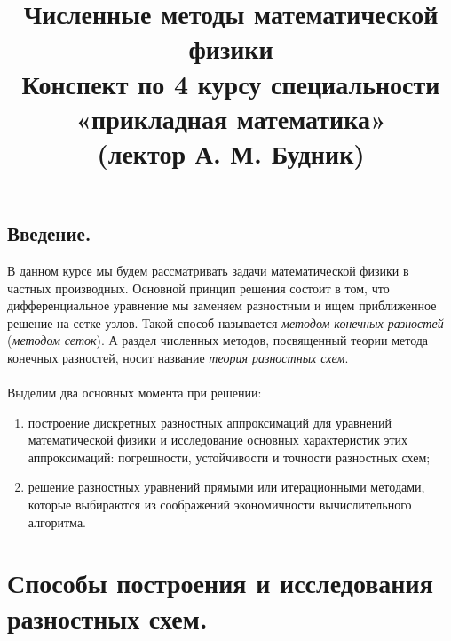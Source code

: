 \documentclass[a4paper, 12pt]{report}
\title{\textbf{\Huge{Численные методы математической физики}}\\Конспект по 4 курсу 
	специальности «прикладная математика»\\(лектор А. М. Будник)}
\date{}
\numberwithin{equation}{section}
\begin{document}
	\maketitle
	\tableofcontents{}
	\newpage
	\section*{Введение.}
	В данном курсе мы будем рассматривать задачи математической физики в частных производных. Основной принцип решения состоит в том, что дифференциальное уравнение мы заменяем разностным и ищем приближенное решение на сетке узлов. Такой способ называется \textit{методом конечных разностей} (\textit{методом сеток}). А раздел численных методов, посвященный теории метода конечных разностей, носит название \textit{теория разностных схем}. 
	\\\\
	Выделим два основных момента при решении:
	\begin{enumerate}
		\item построение дискретных разностных аппроксимаций для уравнений математической физики и исследование основных характеристик этих аппроксимаций: погрешности, устойчивости и точности разностных схем;
		\item решение разностных уравнений прямыми или итерационными методами, которые выбираются из соображений экономичности вычислительного алгоритма.
	\end{enumerate}
	\chapter{Способы построения и исследования разностных схем.}
\end{document}
